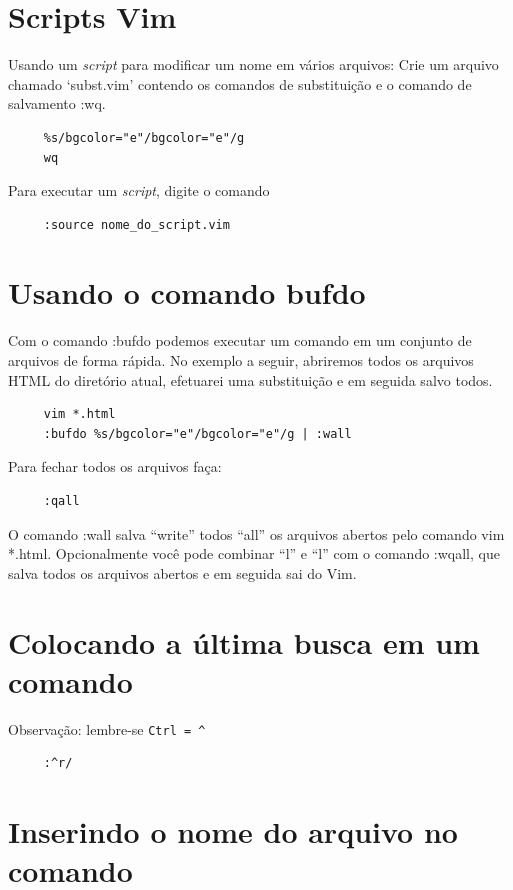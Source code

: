 \documentclass[10pt,a4paper,openany]{book}
\begin{document}
\section{Scripts Vim}\label{Scripts Vim}
Usando um {\em script} para modificar um nome em vários arquivos: 
Crie um arquivo chamado `subst.vim' contendo os comandos de substituição e o
comando de salvamento :wq.

\begin{verbatim}
     %s/bgcolor="e"/bgcolor="e"/g
     wq
\end{verbatim}

Para executar um {\em script}, digite o comando

\begin{verbatim}
     :source nome_do_script.vim
\end{verbatim}

\section{Usando o comando bufdo}\label{Usando o comando bufdo}

Com o comando :bufdo podemos executar um comando em um
conjunto de arquivos de forma rápida. No exemplo a seguir, abriremos
todos os arquivos HTML do diretório atual, efetuarei uma substituição
e em seguida salvo todos.

\begin{verbatim}
     vim *.html
     :bufdo %s/bgcolor="e"/bgcolor="e"/g | :wall
\end{verbatim}

Para fechar todos os arquivos faça:

\begin{verbatim}
     :qall
\end{verbatim}

O comando :wall salva ``write'' todos ``all'' os arquivos
abertos pelo comando vim *.html. Opcionalmente você pode
combinar ``l'' e ``l'' com o comando :wqall, que
salva todos os arquivos abertos e em seguida sai do Vim.

\section{Colocando a última busca em um comando }
Observação: lembre-se \verb|Ctrl = ^|

\begin{verbatim}
     :^r/
\end{verbatim}

\section{Inserindo o nome do arquivo no comando }
\end{document}
